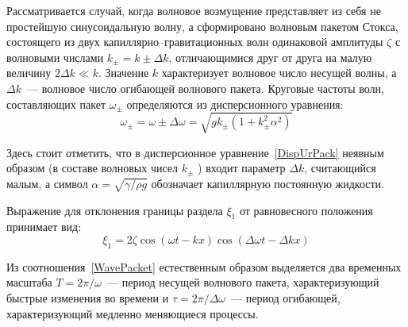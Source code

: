 Рассматривается случай, когда волновое возмущение представляет из себя не простейшую синусоидальную волну, а сформировано волновым пакетом Стокса, состоящего из двух капиллярно--гравитационных волн одинаковой амплитуды  $ \zeta $ с волновыми числами  $ k_{\pm}=k \pm \Delta k $, отличающимися друг от друга на малую величину  $ 2 \Delta k \ll k $. Значение $ k $  характеризует волновое число несущей волны, а  $ \Delta k $~--- волновое число огибающей волнового пакета. Круговые частоты волн, составляющих пакет $ \omega_{\pm} $ определяются из дисперсионного уравнения:
\begin{equation}
\omega_{\pm}=\omega \pm \Delta \omega = \sqrt{g k _{\pm} \left( 1+ k_{\pm}^{2} \alpha^{2} \right)}
\label{DispUrPack}
\end{equation}

Здесь стоит отметить, что в дисперсионное уравнение~\eqref{DispUrPack} неявным образом (в составе волновых чисел $ k_{\pm} $ ) входит параметр $ \Delta k $, считающийся малым, а символ $ \alpha= \sqrt{\gamma/\rho g} $  обозначает капиллярную постоянную жидкости. 

Выражение для отклонения границы раздела $ \xi_{1} $ от равновесного положения принимает вид:
\begin{equation}
\xi_{1}=2\zeta \cos \left( \omega t - k x \right) \cos \left( \Delta \omega t - \Delta k x \right)
\label{WavePacket}  
\end{equation}

Из соотношения~\eqref{WavePacket} естественным образом выделяется два временных масштаба $ T=2\pi/\omega $~--- период несущей волнового пакета, характеризующий быстрые изменения во времени и $ \tau=2\pi/\Delta \omega $~--- период огибающей, характеризующий медленно меняющиеся процессы. 

